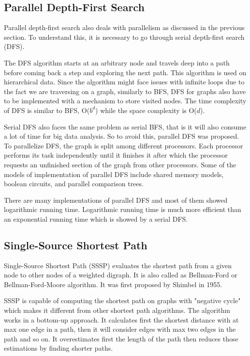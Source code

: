\documentclass[journal,twoside,web]{ieeecolor}
\begin{document}
\subsection{Parallel Depth-First Search}
Parallel depth-first search also deals with parallelism as discussed in the previous section. To understand this, it is necessary to go through serial depth-first search (DFS).

The DFS algorithm starts at an arbitrary node and travels deep into a path before coming back a step and exploring the next path. This algorithm is used on hierarchical data. Since the algorithm might face issues with infinite loops due to the fact we are traversing on a graph, similarly to BFS, DFS for graphs also have to be implemented with a mechanism to store visited nodes. The time complexity of DFS is similar to BFS, O($b^d$) while the space complexity is O($d$).

Serial DFS also faces the same problem as serial BFS, that is it will also consume a lot of time for big data analysis. So to avoid this, parallel DFS was proposed. To parallelize DFS, the graph is split among different processors. Each processor performs its task independently until it finishes it after which the processor requests an unfinished section of the graph from other processors. Some of the models of implementation of parallel DFS include shared memory models, boolean circuits, and parallel comparison trees\cite{38}.  

There are many implementations of parallel DFS and most of them showed logarithmic running time\cite{38}. Logarithmic running time is much more efficient than an exponential running time which is showed by a serial DFS.

\subsection{Single-Source Shortest Path}
Single-Source Shortest Path (SSSP) evaluates the shortest path from a given node to other nodes of a weighted digraph. It is also called as Bellman-Ford or Bellman-Ford-Moore algorithm\cite{41}. It was first proposed by Shimbel\cite{42} in 1955.

SSSP is capable of computing the shortest path on graphs with "negative cycle" which makes it different from other shortest path algorithms. The algorithm works in a bottom-up approach. It calculates first the shortest distance with at max one edge in a path, then it will consider edges with max two edges in the path and so on. It overestimates first the length of the path then reduces those estimations by finding shorter paths. 
\end{document}
